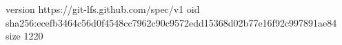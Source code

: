 version https://git-lfs.github.com/spec/v1
oid sha256:ecefb3464c56d0f4548cc7962c90c9572edd15368d02b77e16f92c997891ae84
size 1220
